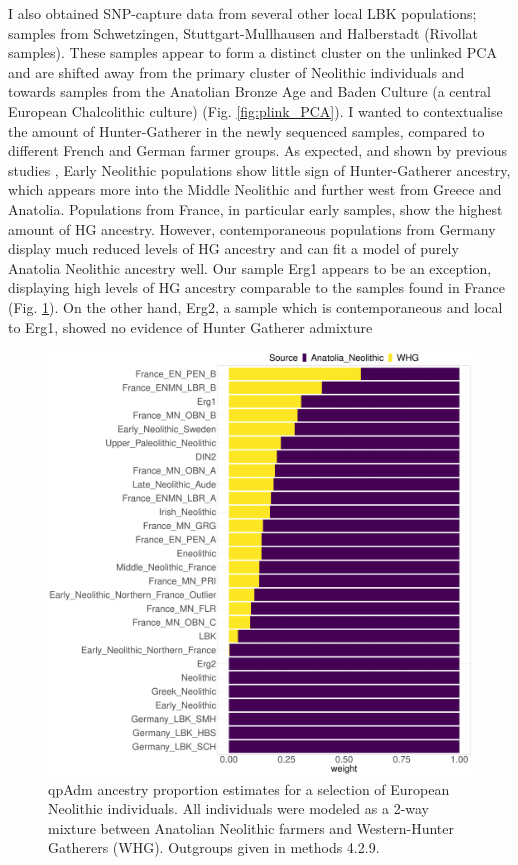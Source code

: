 I also obtained SNP-capture data from several other local LBK populations; samples from Schwetzingen, Stuttgart-Mullhausen and Halberstadt (Rivollat samples). These samples appear to form a distinct cluster on the unlinked PCA and are shifted away from the primary cluster of Neolithic individuals and towards samples from the Anatolian Bronze Age and Baden Culture (a central European Chalcolithic culture) (Fig. \ref{fig:plink_PCA}). I wanted to contextualise the amount of Hunter-Gatherer in the newly sequenced samples, compared to different French and German farmer groups. As expected, and shown by previous studies \cite{Lipson2017}, Early Neolithic populations show little sign of Hunter-Gatherer ancestry, which appears more into the Middle Neolithic and further west from Greece and Anatolia. Populations from France, in particular early samples, show the highest amount of HG ancestry. However, contemporaneous populations from Germany display much reduced levels of HG ancestry and can fit a model of purely Anatolia Neolithic ancestry well. Our sample Erg1 appears to be an exception, displaying high levels of HG ancestry comparable to the samples found in France (Fig. \ref{fig:HG_ancestry_Neolithic}). On the other hand, Erg2, a sample which is contemporaneous and local to Erg1, showed no evidence of Hunter Gatherer admixture 

\begin{figure}[htp]
    \centering
    \includegraphics[width=1.0\textwidth]{../images/chapter4/HG_ancestry_Neolithic.pdf}
    \caption{qpAdm ancestry proportion estimates for a selection of European Neolithic individuals. All individuals were modeled as a 2-way mixture between Anatolian Neolithic farmers and Western-Hunter Gatherers (WHG). Outgroups given in methods 4.2.9.}
    \label{fig:HG_ancestry_Neolithic}
\end{figure}


